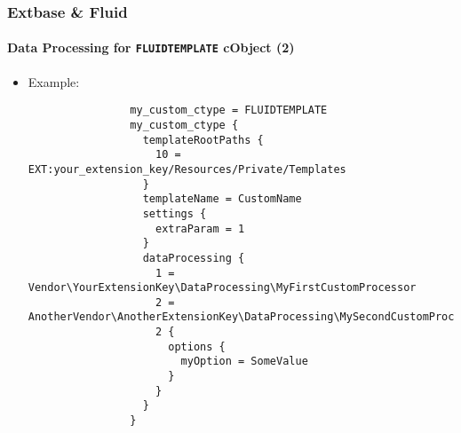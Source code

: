 \begin{frame}[fragile]
	\frametitle{Extbase \& Fluid}
	\framesubtitle{Data Processing for \texttt{FLUIDTEMPLATE} cObject (2)}

	\lstset{basicstyle=\tiny\ttfamily}

	\begin{itemize}

		\item Example:

			\begin{lstlisting}
				my_custom_ctype = FLUIDTEMPLATE
				my_custom_ctype {
				  templateRootPaths {
				    10 = EXT:your_extension_key/Resources/Private/Templates
				  }
				  templateName = CustomName
				  settings {
				    extraParam = 1
				  }
				  dataProcessing {
				    1 = Vendor\YourExtensionKey\DataProcessing\MyFirstCustomProcessor
				    2 = AnotherVendor\AnotherExtensionKey\DataProcessing\MySecondCustomProcessor
				    2 {
				      options {
				        myOption = SomeValue
				      }
				    }
				  }
				}
			\end{lstlisting}

	\end{itemize}

\end{frame}

